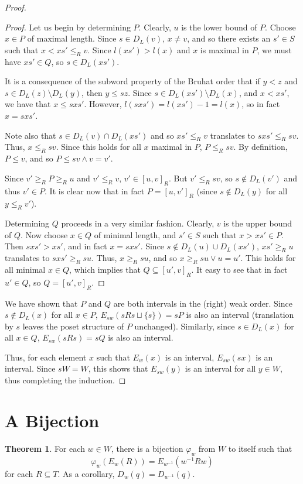 \documentclass[11pt]{article}
\theoremstyle{definition}
\theoremstyle{definition}
\newtheorem{theorem}{Theorem}
\begin{document}
\begin{proof}
\begin{proof}
Let us begin by determining $P$. Clearly, $u$ is the lower bound of $P$. Choose $x \in P$ of maximal length. Since $s \in D_L(v)$, $x \neq v$, and so there exists an $s' \in S$ such that $x < xs' \leq_R v$. Since $l(xs') > l(x)$ and $x$ is maximal in $P$, we must have $xs' \in Q$, so $s \in D_L(xs')$.

It is a consequence of the subword property of the Bruhat order that if $y < z$ and $s \in D_L(z) \setminus D_L(y)$, then $y \leq sz$. Since $s \in D_L(xs') \setminus D_L(x)$, and $x < xs'$, we have that $x \leq sxs'$. However, $l(sxs') = l(xs') - 1 = l(x)$, so in fact $x = sxs'$.

Note also that $s \in D_L(v) \cap D_L(xs')$ and so $xs' \leq_R v$ translates to $sxs' \leq_R sv$. Thus, $x \leq_R sv$. Since this holds for all $x$ maximal in $P$, $P \leq_R sv$. By definition, $P \leq v$, and so $P \leq sv \land v = v'$.

Since $v' \geq_R P \geq_R u$ and $v' \leq_R v$, $v' \in [u, v]_R$. But $v' \leq_R sv$, so $s \notin D_L(v')$ and thus $v' \in P$. It is clear now that in fact $P = [u, v']_R$ (since $s \notin D_L(y)$ for all $y \leq_R v'$).

Determining $Q$ proceeds in a very similar fashion. Clearly, $v$ is the upper bound of $Q$. Now choose $x \in Q$ of minimal length, and $s' \in S$ such that $x > xs' \in P$. Then $sxs' > xs'$, and in fact $x = sxs'$. Since $s \notin D_L(u) \cup D_L(xs')$, $xs' \geq_R u$ translates to $sxs' \geq_R su$. Thus, $x \geq_R su$, and so $x \geq_R su \lor u = u'$. This holds for all minimal $x \in Q$, which implies that $Q \subseteq [u', v]_R$. It easy to see that in fact $u' \in Q$, so $Q = [u', v]_R$.
\end{proof}

We have shown that $P$ and $Q$ are both intervals in the (right) weak order. Since $s \notin D_L(x)$ for all $x \in P$, $E_{sw}(sRs \sqcup \{s\}) = sP$ is also an interval (translation by $s$ leaves the poset structure of $P$ unchanged). Similarly, since $s \in D_L(x)$ for all $x \in Q$, $E_{sw}(sRs) = sQ$ is also an interval.

Thus, for each element $x$ such that $E_w(x)$ is an interval, $E_{sw}(sx)$ is an interval. Since $sW = W$, this shows that $E_{sw}(y)$ is an interval for all $y \in W$, thus completing the induction.
\end{proof}

\section{A Bijection}
\begin{theorem}
For each $w \in W$, there is a bijection $\varphi_w$ from $W$ to itself such that
\[
\varphi_w(E_w(R)) = E_{w^{-1}}(w^{-1}Rw)
\]
for each $R \subseteq T$. As a corollary, $D_w(q) = D_{w^{-1}}(q)$.
\end{theorem}
\end{document}
